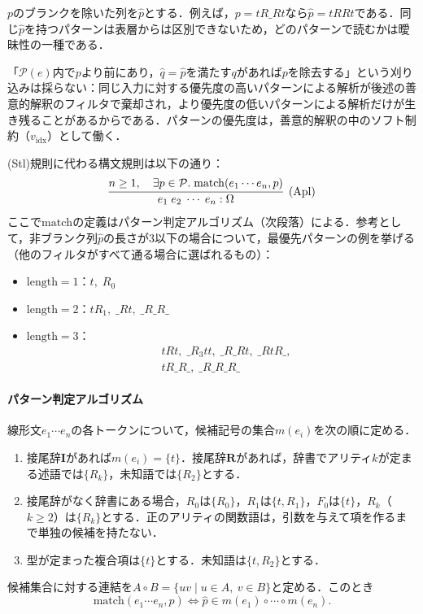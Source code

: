 \documentclass[../../main-detail.tex]{subfiles}
\begin{document}
$p$のブランクを除いた列を$\hat{p}$とする．例えば，$p = tR\_Rt$なら$\hat{p} = tRRt$である．同じ$\hat p$を持つパターンは表層からは区別できないため，どのパターンで読むかは曖昧性の一種である．
\begin{whynot}
「$\mathcal P(e)$内で$p$より前にあり，$\hat q=\hat p$を満たす$q$があれば$p$を除去する」という刈り込みは採らない：同じ入力に対する優先度の高いパターンによる解析が後述の善意的解釈のフィルタで棄却され，より優先度の低いパターンによる解析だけが生き残ることがあるからである．パターンの優先度は，善意的解釈の中のソフト制約（$v_{\mathrm{idx}}$）として働く．
\end{whynot}

(Stl)規則に代わる構文規則は以下の通り：
\[
\infer[\text{(Apl)}]{
    e_1\; e_2\; \cdots\; e_n: \Omega
}{
    n\geq1,\quad\exists p\in\mathcal{P}.\; \mathrm{match}(e_1\cdots e_n, p)
}
\]
ここで$\mathrm{match}$の定義はパターン判定アルゴリズム（次段落）による．参考として，非ブランク列$\hat p$の長さが3以下の場合について，最優先パターンの例を挙げる（他のフィルタがすべて通る場合に選ばれるもの）：
\begin{itemize}
    \item $\text{length} = 1$：$t,\; R_0$
    \item $\text{length} = 2$：$tR_1,\; \_Rt,\; \_R\_R\_$
    \item $\text{length} = 3$：
    \begin{align*}
        & tRt,\; \_R_3tt,\;\_R\_Rt,\; \_RtR\_,\\
        & tR\_R\_,\; \_R\_R\_R\_
    \end{align*}
\end{itemize}

\paragraph{パターン判定アルゴリズム}
線形文$e_1\cdots e_n$の各トークンについて，候補記号の集合$m(e_i)$を次の順に定める．
\begin{enumerate}
    \item 接尾辞$\mathbf I$があれば$m(e_i)=\{t\}$．接尾辞$\mathbf R$があれば，辞書でアリティ$k$が定まる述語では$\{R_k\}$，未知語では$\{R_2\}$とする．
    \item 接尾辞がなく辞書にある場合，$R_0$は$\{R_0\}$，$R_1$は$\{t,R_1\}$，$F_0$は$\{t\}$，$R_k$（$k\geq2$）は$\{R_k\}$とする．正のアリティの関数語は，引数を与えて項を作るまで単独の候補を持たない．
    \item 型が定まった複合項は$\{t\}$とする．未知語は$\{t,R_2\}$とする．
\end{enumerate}
候補集合に対する連結を$A\circ B=\{uv\mid u\in A,\ v\in B\}$と定める．このとき
\[
    \mathrm{match}(e_1\cdots e_n,p)\iff
    \hat p\in m(e_1)\circ\cdots\circ m(e_n).
\]
\end{document}
